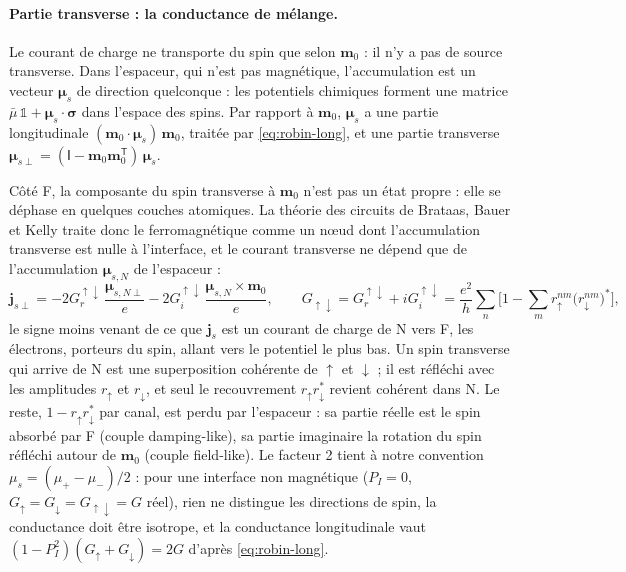 \documentclass[11pt,a4paper]{article}
\newcommand{\vm}{\bm{m}}
\newcommand{\Id}{\mathsf{I}}
\begin{document}
\paragraph{Partie transverse : la conductance de mélange.} Le courant de
charge ne transporte du spin que selon $\vm_0$ : il n'y a pas de source
transverse. Dans l'espaceur, qui n'est pas magnétique, l'accumulation est
un vecteur $\bm{\mu}_s$ de direction quelconque : les potentiels chimiques
forment une matrice $\bar\mu\,\mathds{1} + \bm{\mu}_s\cdot\bm{\sigma}$ dans
l'espace des spins. Par rapport à $\vm_0$, $\bm{\mu}_s$ a une partie
longitudinale $(\vm_0\cdot\bm{\mu}_s)\,\vm_0$, traitée par
\eqref{eq:robin-long}, et une partie transverse
$\bm{\mu}_{s\perp} = (\Id-\vm_0\vm_0^{\mathsf{T}})\,\bm{\mu}_s$.

Côté F, la composante du spin transverse à $\vm_0$ n'est pas un état
propre : elle se déphase en quelques couches atomiques. La théorie des
circuits de Brataas, Bauer et Kelly traite donc le ferromagnétique comme un
nœud dont l'accumulation transverse est nulle à l'interface, et le courant
transverse ne dépend que de l'accumulation $\bm{\mu}_{s,N}$ de l'espaceur :
\begin{equation}
  \bm{j}_{s\perp} = -2G_r^{\uparrow\downarrow}\,\frac{\bm{\mu}_{s,N\perp}}{e}
  - 2G_i^{\uparrow\downarrow}\,\frac{\bm{\mu}_{s,N}\times\vm_0}{e},
  \qquad
  G_{\uparrow\downarrow} = G_r^{\uparrow\downarrow}+iG_i^{\uparrow\downarrow}
  = \frac{e^2}{h}\sum_n\Big[1-\sum_m r_\uparrow^{nm}\big(r_\downarrow^{nm}\big)^*\Big],
  \label{eq:brataas}
\end{equation}
le signe moins venant de ce que $\bm{j}_s$ est un courant de charge de N
vers F, les électrons, porteurs du spin, allant vers le potentiel le plus
bas. Un spin transverse qui arrive de N est une superposition cohérente de
$\uparrow$ et $\downarrow$ ; il est réfléchi avec les amplitudes
$r_\uparrow$ et $r_\downarrow$, et seul le recouvrement
$r_\uparrow r_\downarrow^*$ revient cohérent dans N. Le reste,
$1-r_\uparrow r_\downarrow^*$ par canal, est perdu par l'espaceur : sa
partie réelle est le spin absorbé par F (couple damping-like), sa partie
imaginaire la rotation du spin réfléchi autour de $\vm_0$ (couple
field-like). Le facteur 2 tient à notre convention
$\mu_s = (\mu_+-\mu_-)/2$ : pour une interface non magnétique
($P_I = 0$, $G_\uparrow = G_\downarrow = G_{\uparrow\downarrow} = G$ réel),
rien ne distingue les directions de spin, la conductance doit être
isotrope, et la conductance longitudinale vaut
$(1-P_I^2)(G_\uparrow+G_\downarrow) = 2G$ d'après \eqref{eq:robin-long}.
\end{document}
